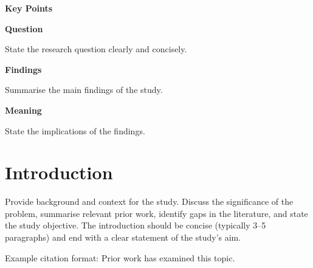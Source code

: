 \documentclass[10pt, letterpaper]{article}
\begin{document}
\hfill
\begin{minipage}[t]{0.33\textwidth}
\begin{mdframed}[style=keypointsbox]
{\sffamily\bfseries\fontsize{10}{12}\selectfont\color{jamacrimson}
Key Points\par}
\vspace{4pt}

{\sffamily\bfseries\fontsize{8.5}{10.5}\selectfont Question\enspace}%
{\fontsize{8.5}{10.5}\selectfont
State the research question clearly and concisely.\par}

\vspace{6pt}

{\sffamily\bfseries\fontsize{8.5}{10.5}\selectfont Findings\enspace}%
{\fontsize{8.5}{10.5}\selectfont
Summarise the main findings of the study.\par}

\vspace{6pt}

{\sffamily\bfseries\fontsize{8.5}{10.5}\selectfont Meaning\enspace}%
{\fontsize{8.5}{10.5}\selectfont
State the implications of the findings.\par}
\end{mdframed}



\end{minipage}

\newpage

\section*{Introduction}

Provide background and context for the study. Discuss the significance of the
problem, summarise relevant prior work, identify gaps in the literature, and
state the study objective. The introduction should be concise (typically 3--5
paragraphs) and end with a clear statement of the study's aim.

Example citation format: Prior work has examined this topic\cite{Smith2023,Jones2022}.


\end{document}
